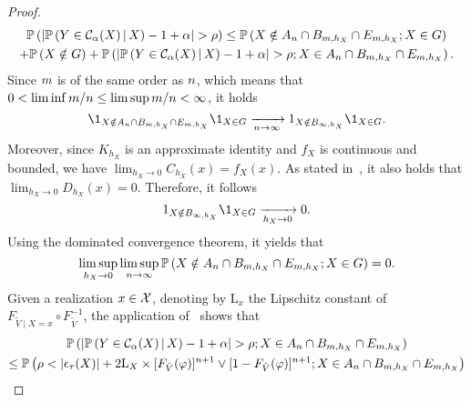 \begin{proof}
  \begin{multline}\label{eq:bound:asymptotic:1}
    \mathbb{P}\left({
      \left\lvert{\mathbb{P}\left({Y\in \mathcal{C}_{\alpha}(X) \,\vert\, X}\right) - 1 + \alpha}\right\rvert
      > \rho
    }\right)
    \le \mathbb{P}\left({ X \notin A_{n} \cap B_{m,h_{X}} \cap E_{m,h_{X}}; X \in G }\right)
    \\
    + \mathbb{P}\left({ X \notin G }\right)
    + \mathbb{P}\left({
      \left\lvert{\mathbb{P}\left({Y\in \mathcal{C}_{\alpha}(X) \,\vert\, X}\right) - 1 + \alpha}\right\rvert
      > \rho; X \in A_{n} \cap B_{m,h_{X}} \cap E_{m,h_{X}}
    }\right)
    .
  \end{multline}
  Since $m$ is of the same order as $n$, which means that $0 < \liminf m/n \le \limsup m/n <\infty$, it holds
  \begin{equation*}
    \1_{ X \notin A_{\tcount} \cap B_{\ccount,h_{X}} \cap E_{\ccount,h_{X}} } \1_{X \in G}
    \xrightarrow[\tcount\to\infty]{} 1_{ X \notin B_{\infty,h_{X}} } \1_{X \in G}.
  \end{equation*}
  Moreover, since $K_{h_{X}}$ is an approximate identity and $f_X$ is continuous and bounded, we have $\lim_{h_{X}\to 0}C_{h_{X}}(x) = f_X(x)$. As stated in~, it also holds that $\lim_{h_{X}\to 0}D_{h_{X}}(x) = 0$. Therefore, it follows
  \begin{equation*}
    1_{ X \notin B_{\infty,h_{X}} } \1_{X \in G}
    \xrightarrow[h_{X}\to 0]{} 0.
  \end{equation*}
  Using the dominated convergence theorem, it yields that
  \begin{equation}\label{eq:bound:asymptotic:3}
    \limsup_{h_{X}\to 0}\limsup_{n\to \infty} \mathbb{P}\left({ X \notin A_{n} \cap B_{m,h_{X}} \cap E_{m,h_{X}}; X \in G }\right)
    = 0.
  \end{equation}
  Given a realization $x\in\mathcal{X}$, denoting by $\mathrm{L}_{x}$ the Lipschitz constant of $F_{\tilde{V}\mid X=x}\circ F_{\tilde{V}}^{-1}$, the application of~ shows that
  \begin{multline*}
    \prob\pr{
      \abs{ \prob\pr{Y\in \mathcal{C}_{\alpha}(X) \,\vert\, X} - 1 + \alpha }
      > \rho; X \in A_{\tcount} \cap B_{\ccount,h_{X}} \cap E_{\ccount,h_{X}}
    }
    \\
    \le \prob\pr{
      \rho
      < \absn{\epsilon_{\tau}(X)} + 2 \mathrm{L}_{X} \times \brn{F_{\tilde{V}}(\varphi)}^{\tcount+1} \vee \brn{1 - F_{\tilde{V}}(\varphi)}^{\tcount+1}; X \in A_{\tcount} \cap B_{\ccount,h_{X}} \cap E_{\ccount,h_{X}}
    }

\end{multline*}
\end{proof}
